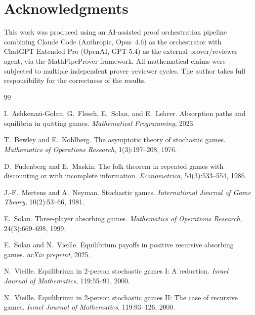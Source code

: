 \documentclass[12pt,a4paper]{article}
\theoremstyle{definition}
\begin{document}
\section*{Acknowledgments}

This work was produced using an AI-assisted proof orchestration pipeline combining Claude Code (Anthropic, Opus~4.6) as the orchestrator with ChatGPT Extended Pro (OpenAI, GPT-5.4) as the external prover/reviewer agent, via the MathPipeProver framework. All mathematical claims were subjected to multiple independent prover--reviewer cycles. The author takes full responsibility for the correctness of the results.

\begin{thebibliography}{99}

I.~Ashkenazi-Golan, G.~Flesch, E.~Solan, and E.~Lehrer.
\newblock Absorption paths and equilibria in quitting games.
\newblock \emph{Mathematical Programming}, 2023.

T.~Bewley and E.~Kohlberg.
\newblock The asymptotic theory of stochastic games.
\newblock \emph{Mathematics of Operations Research}, 1(3):197--208, 1976.

D.~Fudenberg and E.~Maskin.
\newblock The folk theorem in repeated games with discounting or with incomplete information.
\newblock \emph{Econometrica}, 54(3):533--554, 1986.

J.-F.~Mertens and A.~Neyman.
\newblock Stochastic games.
\newblock \emph{International Journal of Game Theory}, 10(2):53--66, 1981.

E.~Solan.
\newblock Three-player absorbing games.
\newblock \emph{Mathematics of Operations Research}, 24(3):669--698, 1999.

E.~Solan and N.~Vieille.
\newblock Equilibrium payoffs in positive recursive absorbing games.
\newblock \emph{arXiv preprint}, 2025.

N.~Vieille.
\newblock Equilibrium in 2-person stochastic games I: A reduction.
\newblock \emph{Israel Journal of Mathematics}, 119:55--91, 2000.

N.~Vieille.
\newblock Equilibrium in 2-person stochastic games II: The case of recursive games.
\newblock \emph{Israel Journal of Mathematics}, 119:93--126, 2000.

\end{thebibliography}
\end{document}
